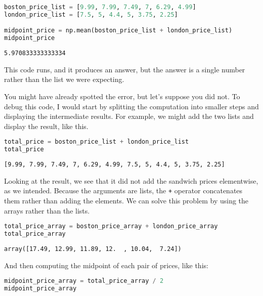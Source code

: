 \begin{lstlisting}[language=Python,style=source]
boston_price_list = [9.99, 7.99, 7.49, 7, 6.29, 4.99]
london_price_list = [7.5, 5, 4.4, 5, 3.75, 2.25]

midpoint_price = np.mean(boston_price_list + london_price_list)
midpoint_price
\end{lstlisting}

\begin{lstlisting}[style=output]
5.970833333333334
\end{lstlisting}

This code runs, and it produces an answer, but the answer is a single
number rather than the list we were expecting.

You might have already spotted the error, but let's suppose you did not.
To debug this code, I would start by splitting the computation into
smaller steps and displaying the intermediate results. For example, we
might add the two lists and display the result, like this.

\begin{lstlisting}[language=Python,style=source]
total_price = boston_price_list + london_price_list
total_price
\end{lstlisting}

\begin{lstlisting}[style=output]
[9.99, 7.99, 7.49, 7, 6.29, 4.99, 7.5, 5, 4.4, 5, 3.75, 2.25]
\end{lstlisting}

Looking at the result, we see that it did not add the sandwich prices
elementwise, as we intended. Because the arguments are lists, the
\passthrough{\lstinline!+!} operator concatenates them rather than
adding the elements. We can solve this problem by using the arrays
rather than the lists.

\begin{lstlisting}[language=Python,style=source]
total_price_array = boston_price_array + london_price_array
total_price_array
\end{lstlisting}

\begin{lstlisting}[style=output]
array([17.49, 12.99, 11.89, 12.  , 10.04,  7.24])
\end{lstlisting}

And then computing the midpoint of each pair of prices, like this:

\begin{lstlisting}[language=Python,style=source]
midpoint_price_array = total_price_array / 2
midpoint_price_array
\end{lstlisting}

